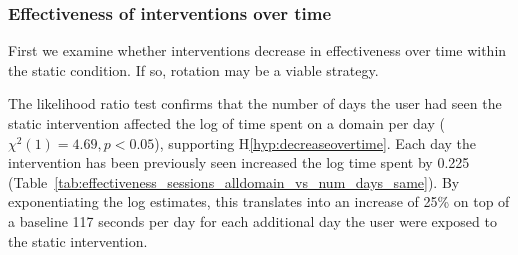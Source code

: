 
\subsubsection{Effectiveness of interventions over time}
First we examine whether interventions decrease in effectiveness over time within the static condition. If so, rotation may be a viable strategy.




The likelihood ratio test confirms that the number of days the user had seen the static intervention affected the log of time spent on a domain per day ($\chi^{2}(1) = 4.69, p < 0.05$), supporting H\ref*{hyp:decreaseovertime}. Each day the intervention has been previously seen increased the log time spent by 0.225 (Table~\ref{tab:effectiveness_sessions_alldomain_vs_num_days_same}). By exponentiating the log estimates, this translates into an increase of 25\% on top of a baseline 117 seconds per day for each additional day the user were exposed to the static intervention. %


